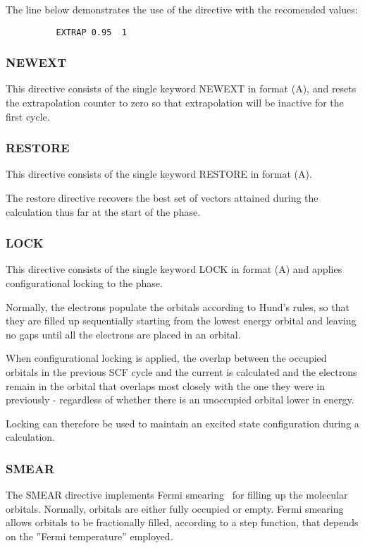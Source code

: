\documentclass[11pt,fleqn]{article}
\begin{document}
The line below demonstrates the use of the directive with the
recomended values:

{
\footnotesize
\begin{verbatim}
          EXTRAP 0.95  1
\end{verbatim}
}

\subsubsection[NEWEXT]{NEWEXT}
This directive consists of the single keyword NEWEXT in format (A),
and resets the extrapolation counter to zero so that extrapolation
will be inactive for the first cycle.

\subsubsection[RESTORE]{RESTORE}
This directive consists of the single keyword RESTORE in format (A).

The restore directive recovers the best set of vectors attained during
the calculation thus far at the start of the phase.

\subsubsection[LOCK]{LOCK}
This directive consists of the single keyword LOCK in format (A) and
applies configurational locking to the phase.

Normally, the electrons populate the orbitals according to Hund's
rules, so that they are filled up sequentially starting from the
lowest energy orbital and leaving no gaps until all the electrons are
placed in an orbital.

When configurational locking is applied, the overlap between the
occupied orbitals in the previous SCF cycle and the current is
calculated and the electrons remain in the orbital that overlaps most
closely with the one they were in previously - regardless of whether
there is an unoccupied orbital lower in energy.

Locking can therefore be used to maintain an excited state
configuration during a calculation.

\subsubsection[SMEAR]{SMEAR}
The SMEAR directive implements Fermi smearing~\cite{warren} for filling up the
molecular orbitals. Normally, orbitals are either fully occupied or
empty. Fermi smearing allows orbitals to be fractionally filled,
according to a step function, that depends on the ''Fermi
temperature'' employed.
\end{document}
